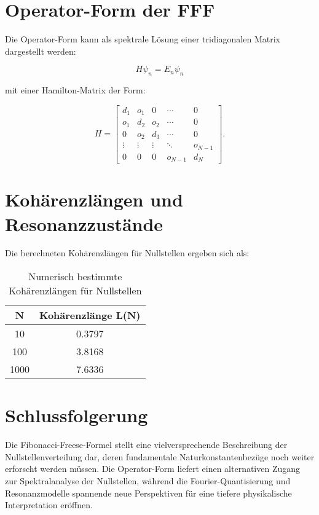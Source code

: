 \documentclass[a4paper,12pt]{article}
\begin{document}
\section{Operator-Form der FFF}
Die Operator-Form kann als spektrale Lösung einer tridiagonalen Matrix dargestellt werden:

\begin{equation}
H \psi_n = E_n \psi_n
\end{equation}

mit einer Hamilton-Matrix der Form:

\begin{equation}
H = \begin{bmatrix}
d_1 & o_1 & 0 & \cdots & 0 \\
o_1 & d_2 & o_2 & \cdots & 0 \\
0 & o_2 & d_3 & \cdots & 0 \\
\vdots & \vdots & \vdots & \ddots & o_{N-1} \\
0 & 0 & 0 & o_{N-1} & d_N
\end{bmatrix}.
\end{equation}

\section{Kohärenzlängen und Resonanzzustände}
Die berechneten Kohärenzlängen für Nullstellen ergeben sich als:

\begin{table}[h]
\centering
\begin{tabular}{cc}
\toprule
\textbf{N} & \textbf{Kohärenzlänge L(N)} \\
\midrule
10 & 0.3797 \\
100 & 3.8168 \\
1000 & 7.6336 \\
\bottomrule
\end{tabular}
\caption{Numerisch bestimmte Kohärenzlängen für Nullstellen}
\end{table}

\section{Schlussfolgerung}
Die Fibonacci-Freese-Formel stellt eine vielversprechende Beschreibung der Nullstellenverteilung dar, deren fundamentale Naturkonstantenbezüge noch weiter erforscht werden müssen. Die Operator-Form liefert einen alternativen Zugang zur Spektralanalyse der Nullstellen, während die Fourier-Quantisierung und Resonanzmodelle spannende neue Perspektiven für eine tiefere physikalische Interpretation eröffnen.
\end{document}
